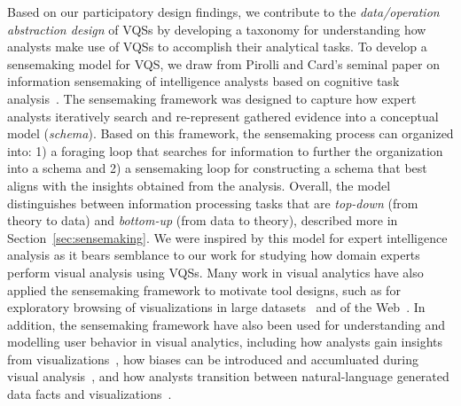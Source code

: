 {  %
  \par {}
  \npar Based on our participatory design findings, we contribute to the \textit{data/operation abstraction design} of VQSs by developing a taxonomy for understanding how analysts make use of VQSs to accomplish their analytical tasks. To develop a sensemaking model for VQS, we draw from Pirolli and Card's seminal paper on information sensemaking of intelligence analysts based on cognitive task analysis~\cite{Pirolli}. The sensemaking framework was designed to capture how expert analysts iteratively search and re-represent gathered evidence into a conceptual model (\emph{schema}). Based on this framework, the sensemaking process can organized into: 1) a foraging loop that searches for information to further the organization into a schema and 2) a sensemaking loop for constructing a schema that best aligns with the insights obtained from the analysis. Overall, the model distinguishes between information processing tasks that are \textit{top-down} (from theory to data) and \textit{bottom-up} (from data to theory), described more in Section~\ref{sec:sensemaking}. We were inspired by this model for expert intelligence analysis as it bears semblance to our work for studying how domain experts perform visual analysis using VQSs. Many work in visual analytics have also applied the sensemaking framework to motivate tool designs, such as for exploratory browsing of visualizations in large datasets~\cite{Battle2016} and of the Web~\cite{Olston2003}. In addition, the sensemaking framework have also been used for understanding and modelling user behavior in visual analytics, including how analysts gain insights from visualizations~\cite{Yi2008}, how biases can be introduced and accumluated during visual analysis~\cite{Wall2017}, and how analysts transition between natural-language generated data facts and visualizations~\cite{Srinivasan2019}.





   
  
  
 } 
  